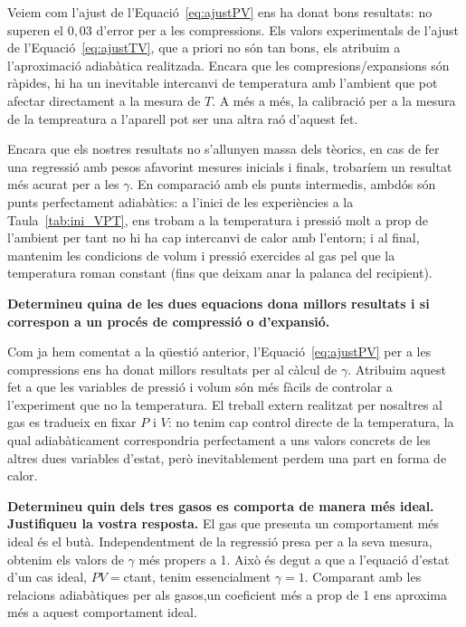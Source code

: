 \documentclass[a4paper,twoside,12pt]{article}
\theoremstyle{definition}
\begin{document}
Veiem com l'ajust de l'Equació~\ref{eq:ajustPV} ens ha donat bons resultats: no superen el $0,03$ d'error per a les compressions. Els valors experimentals de l'ajust de l'Equació~\ref{eq:ajustTV}, que a priori no són tan bons, els atribuim a l'aproximació adiabàtica realitzada. Encara que les compresions/expansions són ràpides, hi ha un inevitable intercanvi de temperatura amb l'ambient que pot afectar directament a la mesura de $T$. A més a més, la calibració per a la mesura de la tempreatura a l'aparell pot ser una altra raó d'aquest fet.

Encara que els nostres resultats no s'allunyen massa dels tèorics, en cas de fer una regressió amb pesos afavorint mesures inicials i finals, trobaríem un resultat més acurat per a les $\gamma$. En comparació amb els punts intermedis, ambdós són punts perfectament adiabàtics: a l'inici de les experiències a la Taula~\ref{tab:ini_VPT}, ens trobam a la temperatura i pressió molt a prop de l'ambient per tant no hi ha cap intercanvi de calor amb l'entorn; i al final, mantenim les condicions de volum i pressió exercides al gas pel que la temperatura roman constant (fins que deixam anar la palanca del recipient).



	\textbf{ Determineu quina de les dues equacions dona millors resultats i si correspon a un procés de compressió o d’expansió.}
	
	Com ja hem comentat a la qüestió anterior, l'Equació~\ref{eq:ajustPV} per a les compressions ens ha donat millors resultats per al càlcul de $\gamma$. Atribuim aquest fet a que les variables de pressió i volum són més fàcils de controlar a l'experiment que no la temperatura. El treball extern realitzat per nosaltres al gas es tradueix en fixar $P$ i $V$: no tenim cap control directe de la temperatura, la qual adiabàticament correspondria perfectament a uns valors concrets de les altres dues variables d'estat, però inevitablement perdem una part en forma de calor.
	
	\newpage
	
	\textbf{Determineu quin dels tres gasos es comporta de manera més ideal. Justifiqueu la vostra resposta.}
	El gas que presenta un comportament més ideal és el butà. Independentment de la regressió presa per a la seva mesura, obtenim els valors de $\gamma$ més propers a 1.  Això és degut a que  a l'equació d'estat d'un cas ideal, $PV = $ctant, tenim essencialment $\gamma = 1$. Comparant amb les relacions adiabàtiques per als gasos,un coeficient més a prop de 1 ens aproxima més a aquest comportament ideal.
	
\end{document}

